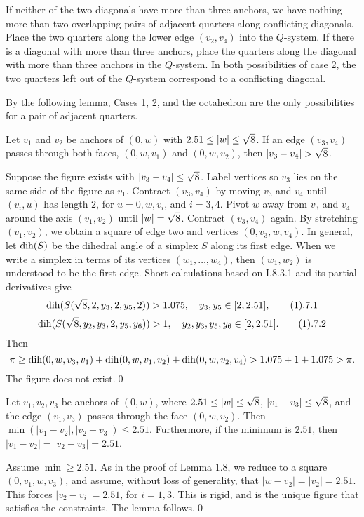 If neither of the two diagonals have more than three anchors, we
have nothing more than two overlapping pairs of adjacent quarters along
conflicting diagonals.  Place the
two quarters along the lower edge $(v_2,v_4)$ into
the $Q$-system.
If there is a diagonal with more than three anchors, 
place the
quarters along the diagonal with more than three anchors in the
$Q$-system.
  In both possibilities of case 2, the two quarters
left out of the $Q$-system correspond to a conflicting diagonal.

By the following lemma, Cases 1, 2, and the octahedron
are the only possibilities for a pair of adjacent quarters.

Let $v_1$ and $v_2$ be anchors of $(0,w)$ with $2.51\le |w|\le \sqrt8$.
If an edge $(v_3,v_4)$
passes through both faces, $(0,w,v_1)$ and
$(0,w,v_2)$, then $|v_3-v_4|>\sqr8$. 
\endproclaim

  Suppose the figure exists with $|v_3-v_4|\le\sqrt8$.
Label vertices so $v_3$ lies on the same side of the
figure as $v_1$.  
Contract $(v_3,v_4)$ by moving $v_3$ and $v_4$ until 
	$(v_i,u)$ has length $2$,
for $u=0,w,v_i$, and $i=3,4$.
Pivot $w$ away from $v_3$ and $v_4$ around the axis $(v_1,v_2)$ until
	$|w|=\sqrt8$.
Contract $(v_3,v_4)$ again. By stretching $(v_1,v_2)$, 
we obtain a square of edge two and vertices
$(0,v_3,w,v_4)$.
In general,
let $\operatorname{dih}(S)$ be the dihedral angle of a simplex $S$ along its first edge.
When we write a simplex in terms of its vertices $(w_1,\ldots,w_4)$,
then $(w_1,w_2)$ is understood to be the first edge.
Short calculations based on I.8.3.1 and its partial derivatives give
$$\dih(S(\sqr8,2,y_3,2,y_5,2)) > 1.075,\quad y_3,y_5\in[2,2.51],\tag1.7.1$$
$$\dih(S(\sqr8,y_2,y_3,2,y_5,y_6)) >1,\quad
		y_2,y_3,y_5,y_6\in[2,2.51].\tag1.7.2$$
Then
$$\pi\ge \operatorname{dih}(0,w,v_3,v_1) + \operatorname{dih}(0,w,v_1,v_2) + \operatorname{dih}(0,w,v_2,v_4)
	> 1.075 + 1 + 1.075 > \pi.$$
The figure does not exist.\qed\enddemo

  Let $v_1,v_2,v_3$ be anchors of $(0,w)$, where
$2.51\le|w|\le\sqrt8$, $|v_1-v_3|\le\sqrt8$, and the edge $(v_1,v_3)$
passes through the face
$(0,w,v_2)$.  Then $\min(|v_1-v_2|,|v_2-v_3|)\le2.51$.
Furthermore, if the minimum is $2.51$, then $|v_1-v_2|=|v_2-v_3|=2.51$.
\endproclaim

Assume $\min\ge2.51$.
As in the proof of Lemma 1.8, we reduce to a square $(0,v_1,w,v_3)$,
and assume, without loss of generality, that $|w-v_2|=|v_2|=2.51$.
This forces $|v_2-v_i|=2.51$, for $i=1,3$.
This is rigid,  and is the unique figure that satisfies the constraints.
The lemma follows.\qed\enddemo

